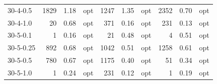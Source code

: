 \documentclass[11pt]{article}
\begin{document}
\begin{table}[]
\begin{tabular}{lrrlrrlrrl}
30-4-0.5  & 1829     & 1.18    & opt    & 1247     & 1.35     & opt   & 2352     & 0.70     & opt   \\
30-4-1.0  & 20       & 0.68    & opt    & 371      & 0.16     & opt   & 231      & 0.13     & opt   \\
30-5-0.1  & 1        & 0.16    & opt    & 21       & 0.48     & opt   & 4        & 0.51     & opt   \\
30-5-0.25 & 892      & 0.68    & opt    & 1042     & 0.51     & opt   & 1258     & 0.61     & opt   \\
30-5-0.5  & 780      & 0.67    & opt    & 1175     & 0.40     & opt   & 51       & 0.34     & opt   \\
30-5-1.0  & 1        & 0.24    & opt    & 231      & 0.12     & opt   & 1        & 0.19     & opt
\end{tabular}
\end{table}
\end{document}
